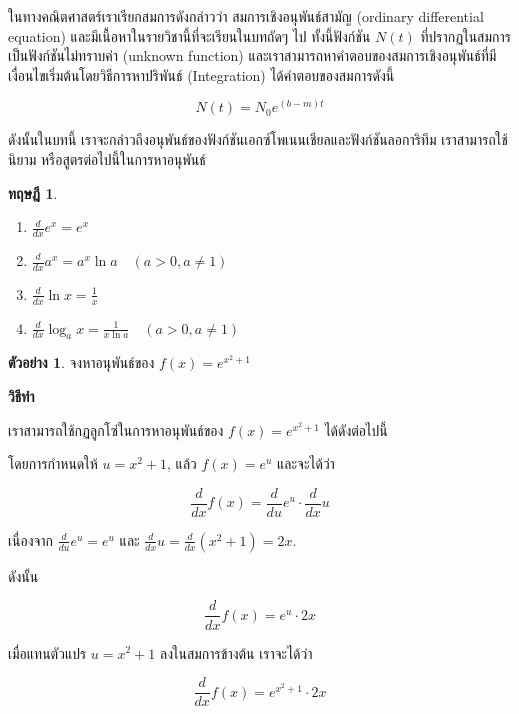 \documentclass[
]{book}
\providecommand{\tightlist}{%
  \setlength{\itemsep}{0pt}\setlength{\parskip}{0pt}}
\newtheorem{theorem}{ทฤษฎี}[chapter]
\theoremstyle{definition}
\theoremstyle{definition}
\newtheorem{example}{ตัวอย่าง}[chapter]
\theoremstyle{definition}
\theoremstyle{definition}
\theoremstyle{remark}
\begin{document}
ในทางคณิตศาสตร์เราเรียกสมการดังกล่าวว่า สมการเชิงอนุพันธ์สามัญ (ordinary
differential equation) และมีเนื้อหาในรายวิชานี้ที่จะเรียนในบทถัดๆ ไป ทั้งนี้ฟังก์ชัน
\(N(t)\) ที่ปรากฏในสมการเป็นฟังก์ชันไม่ทราบค่า (unknown function)
และเราสามารถหาคำตอบของสมการเชิงอนุพันธ์ที่มีเงื่อนไขเริ่มต้นโดยวิธีการหาปริพันธ์
(Integration) ได้คำตอบของสมการดังนี้

\begin{equation}
N(t) = N_0 e^{(b-m)t}
\label{eq:population-growth-chapter3-2}
\end{equation}

ดังนั้นในบทนี้ เราจะกล่าวถึงอนุพันธ์ของฟังก์ชันเอกซ์โพเนนเชียลและฟังก์ชันลอการิทึม
เราสามารถใช้นิยาม หรือสูตรต่อไปนี้ในการหาอนุพันธ์

\begin{theorem}
\leavevmode

\begin{enumerate}
\def\labelenumi{\arabic{enumi}.}
\tightlist
\item
  \(\displaystyle\frac{d}{dx}e^x = e^x\)
\item
  \(\displaystyle\frac{d}{dx}a^x = a^x \ln a \quad (a > 0, a \neq 1)\)
\item
  \(\displaystyle\frac{d}{dx}\ln x = \frac{1}{x}\)
\item
  \(\displaystyle\frac{d}{dx}\log_a x = \frac{1}{x \ln a} \quad (a > 0, a \neq 1)\)
\end{enumerate}

\end{theorem}

\begin{example}
จงหาอนุพันธ์ของ \(f(x) = e^{x^2 + 1}\)
\end{example}

\textbf{วิธีทำ}

เราสามารถใช้กฏลูกโซ่ในการหาอนุพันธ์ของ \(f(x) = e^{x^2 + 1}\) ได้ดังต่อไปนี้

โดยการกำหนดให้ \(u = x^2 + 1\), แล้ว \(f(x) = e^u\) และจะได้ว่า

\[ \frac{d}{dx} f(x) = \frac{d}{du} e^u \cdot \frac{d}{dx} u \]

เนื่องจาก \(\frac{d}{du} e^u = e^u\) และ
\(\frac{d}{dx} u = \frac{d}{dx} (x^2 + 1) = 2x\).

ดังนั้น

\[ \frac{d}{dx} f(x) = e^u \cdot 2x \]

เมื่อแทนตัวแปร \(u = x^2 + 1\) ลงในสมการข้างต้น เราจะได้ว่า

\[ \frac{d}{dx} f(x) = e^{x^2 + 1} \cdot 2x \]
\end{document}

